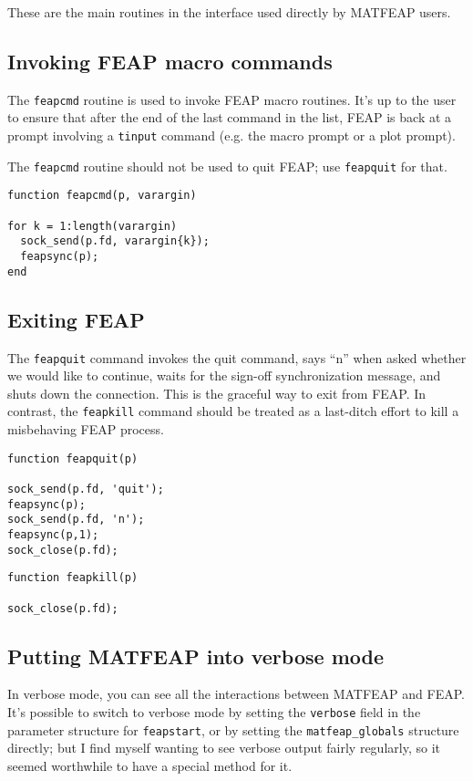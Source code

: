 These are the main routines in the interface used directly by MATFEAP
users.

\subsection{Invoking FEAP macro commands}

The {\tt feapcmd} routine is used to invoke FEAP macro routines.
It's up to the user to ensure that after the end of the last command
in the list, FEAP is back at a prompt involving a {\tt tinput}
command (e.g. the macro prompt or a plot prompt).

The {\tt feapcmd} routine should not be used to quit FEAP; use
{\tt feapquit} for that.

\begin{verbatim}
function feapcmd(p, varargin)

for k = 1:length(varargin)
  sock_send(p.fd, varargin{k});
  feapsync(p);
end
\end{verbatim}
\subsection{Exiting FEAP}

The {\tt feapquit} command invokes the quit command, says ``n''
when asked whether we would like to continue, waits for the
sign-off synchronization message, and shuts down the connection.
This is the graceful way to exit from FEAP.  In contrast, the
{\tt feapkill} command should be treated as a last-ditch effort
to kill a misbehaving FEAP process.

\begin{verbatim}
function feapquit(p)

sock_send(p.fd, 'quit');
feapsync(p);
sock_send(p.fd, 'n');
feapsync(p,1);
sock_close(p.fd);
\end{verbatim}
\begin{verbatim}
function feapkill(p)

sock_close(p.fd);
\end{verbatim}
\subsection{Putting MATFEAP into verbose mode}

In verbose mode, you can see all the interactions between MATFEAP
and FEAP.  It's possible to switch to verbose mode by setting the
{\tt verbose} field in the parameter structure for {\tt feapstart},
or by setting the {\tt matfeap\_globals} structure directly; but
I find myself wanting to see verbose output fairly regularly, so
it seemed worthwhile to have a special method for it.

